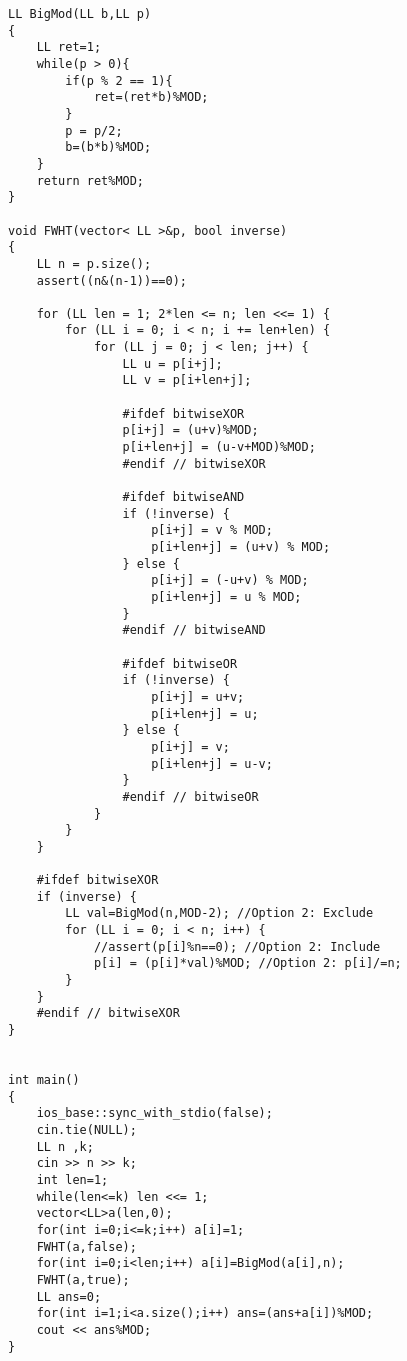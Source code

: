 \documentclass[FSZ,a4paper,onesided]{article}
\begin{document}
\begin{multicols*}{\COLS}
\begin{lstlisting}
LL BigMod(LL b,LL p)
{
    LL ret=1;
    while(p > 0){
        if(p % 2 == 1){
            ret=(ret*b)%MOD;
        }
        p = p/2;
        b=(b*b)%MOD;
    }
    return ret%MOD;
}

void FWHT(vector< LL >&p, bool inverse)
{
    LL n = p.size();
    assert((n&(n-1))==0);

    for (LL len = 1; 2*len <= n; len <<= 1) {
        for (LL i = 0; i < n; i += len+len) {
            for (LL j = 0; j < len; j++) {
                LL u = p[i+j];
                LL v = p[i+len+j];

                #ifdef bitwiseXOR
                p[i+j] = (u+v)%MOD;
                p[i+len+j] = (u-v+MOD)%MOD;
                #endif // bitwiseXOR

                #ifdef bitwiseAND
                if (!inverse) {
                    p[i+j] = v % MOD;
                    p[i+len+j] = (u+v) % MOD;
                } else {
                    p[i+j] = (-u+v) % MOD;
                    p[i+len+j] = u % MOD;
                }
                #endif // bitwiseAND

                #ifdef bitwiseOR
                if (!inverse) {
                    p[i+j] = u+v;
                    p[i+len+j] = u;
                } else {
                    p[i+j] = v;
                    p[i+len+j] = u-v;
                }
                #endif // bitwiseOR
            }
        }
    }

    #ifdef bitwiseXOR
    if (inverse) {
        LL val=BigMod(n,MOD-2); //Option 2: Exclude
        for (LL i = 0; i < n; i++) {
            //assert(p[i]%n==0); //Option 2: Include
            p[i] = (p[i]*val)%MOD; //Option 2: p[i]/=n;
        }
    }
    #endif // bitwiseXOR
}


int main()
{
    ios_base::sync_with_stdio(false);
    cin.tie(NULL);
    LL n ,k;
    cin >> n >> k;
    int len=1;
    while(len<=k) len <<= 1;
    vector<LL>a(len,0);
    for(int i=0;i<=k;i++) a[i]=1;
    FWHT(a,false);
    for(int i=0;i<len;i++) a[i]=BigMod(a[i],n);
    FWHT(a,true);
    LL ans=0;
    for(int i=1;i<a.size();i++) ans=(ans+a[i])%MOD;
    cout << ans%MOD;
}
\end{lstlisting}

\end{multicols*}
\end{document}

